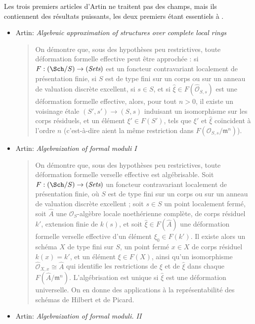 \noindent
Les trois premiers articles d'Artin ne traitent pas des champs, mais ils
contiennent des résultats puissants, les deux premiers étant essentiels à
\cite{ArtinVersal}.
\begin{itemize}
\item Artin: \emph{Algebraic approximation of structures over
complete local rings} \cite{Artin-Algebraic-Approximation}
\begin{quote}
On démontre que, sous des hypothèses peu restrictives, toute déformation formelle
effective peut être approchée : si $F: (\Sch/S) \to (\textit{Sets})$
est un foncteur contravariant
localement de présentation finie, si $S$ est de type fini sur un corps ou sur un
anneau de valuation discrète excellent, si $s \in S$, et si
$\hat{\xi} \in F(\hat{\mathcal{O}}_{S, s})$ est une déformation formelle
effective, alors, pour tout $n > 0$, il existe un voisinage étale
$(S', s') \to (S, s)$ induisant un isomorphisme sur les corps résiduels, et
un élément $\xi' \in F(S')$, tels que $\xi'$ et
$\hat{\xi}$ coïncident à l'ordre $n$ (c'est-à-dire aient la même restriction dans
$F(\mathcal{O}_{S, s} / \mathfrak m^n)$).
\end{quote}
\item
Artin: \emph{Algebraization of formal moduli I} \cite{ArtinI}
\begin{quote}
On démontre que, sous des hypothèses peu restrictives, toute déformation formelle
verselle effective est algébrisable. Soit
$F: (\Sch/S) \to (\textit{Sets})$ un foncteur contravariant
localement de présentation finie, où $S$ est de type fini sur un corps ou sur un
anneau de valuation discrète excellent ; soit $s \in S$ un point localement
fermé, soit $\hat A$ une $\mathcal{O}_S$-algèbre locale noethérienne complète,
de corps résiduel $k'$, extension finie de $k(s)$,
et soit $\hat{\xi} \in F(\hat A)$ une déformation formelle verselle effective d'un
élément $\xi_0 \in F(k')$. Il existe alors un schéma $X$ de type fini sur $S$,
un point fermé $x \in X$ de corps résiduel $k(x) = k'$, et un élément
$\xi \in F(X)$, ainsi qu'un isomorphisme
$\hat{\mathcal{O}}_{X, x} \cong \hat{A}$
qui identifie les restrictions de $\xi$ et de $\hat{\xi}$ dans chaque
$F(\hat A / \mathfrak m^n)$. L'algébrisation
est unique si $\hat{\xi}$ est une déformation universelle. On en donne des
applications à la représentabilité des schémas de Hilbert et de Picard.
\end{quote}
\item Artin: \emph{Algebraization of formal moduli. II}
\cite{ArtinII}
\begin{quote}

\end{quote}
\end{itemize}
